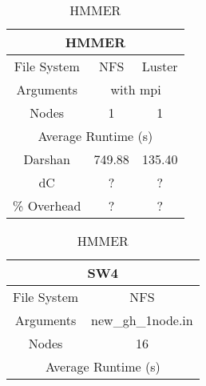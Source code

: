 \begin{table}[h]
    \begin{subtable}[h]{0.22\textwidth}
        \setlength\tabcolsep{3pt}
        \begin{tabular}{|cclcl|}
        \hline
        \multicolumn{5}{|c|}{HMMER}                                                                                  \\ \hline
        \multicolumn{1}{|c|}{File System}      & \multicolumn{2}{c|}{NFS}         & \multicolumn{2}{c|}{Luster}      \\ \hline
        \multicolumn{1}{|c|}{Arguments}        & \multicolumn{4}{c|}{with mpi}                                       \\ \hline
        \multicolumn{1}{|c|}{Nodes}            & \multicolumn{2}{c|}{1}           & \multicolumn{2}{c|}{1}           \\ \hline
        \multicolumn{5}{|c|}{Average Runtime (s)}                                                                        \\ \hline
        \multicolumn{1}{|c|}{Darshan}          & \multicolumn{2}{c|}{749.88} & \multicolumn{2}{c|}{135.40} \\ \hline
        \multicolumn{1}{|c|}{dC} & \multicolumn{2}{c|}{?}           & \multicolumn{2}{c|}{?}           \\ \hline
        \multicolumn{1}{|c|}{\% Overhead}      & \multicolumn{2}{c|}{?}           & \multicolumn{2}{c|}{?}           \\ \hline
        \end{tabular}
    \caption{HMMER} 
    \label{subtable:HMMER}
\end{subtable}
    \vspace{0.5cm}
    \begin{subtable}[h]{0.2\textwidth}
        \setlength\tabcolsep{2pt}
        \begin{tabular}{|ccl|}
        \hline
        \multicolumn{3}{|c|}{SW4}                                                       \\ \hline
        \multicolumn{1}{|c|}{File System}      & \multicolumn{2}{c|}{NFS}               \\ \hline
        \multicolumn{1}{|c|}{Arguments}        & \multicolumn{2}{c|}{new\_gh\_1node.in} \\ \hline
        \multicolumn{1}{|c|}{Nodes}            & \multicolumn{2}{c|}{16}                \\ \hline
        \multicolumn{3}{|c|}{Average Runtime (s)}                                           \\ \hline

\end{tabular}
\end{subtable}
\end{table}
